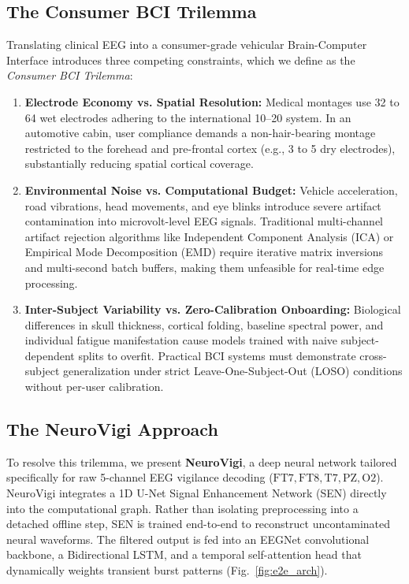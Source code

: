 \documentclass[conference]{IEEEtran}
\begin{document}
\subsection{The Consumer BCI Trilemma}
Translating clinical EEG into a consumer-grade vehicular Brain-Computer Interface introduces three competing constraints, which we define as the \emph{Consumer BCI Trilemma}:
\begin{enumerate}[leftmargin=*]
    \item \textbf{Electrode Economy vs. Spatial Resolution:} Medical montages use 32 to 64 wet electrodes adhering to the international 10--20 system. In an automotive cabin, user compliance demands a non-hair-bearing montage restricted to the forehead and pre-frontal cortex (e.g., 3 to 5 dry electrodes), substantially reducing spatial cortical coverage.
    \item \textbf{Environmental Noise vs. Computational Budget:} Vehicle acceleration, road vibrations, head movements, and eye blinks introduce severe artifact contamination into microvolt-level EEG signals. Traditional multi-channel artifact rejection algorithms like Independent Component Analysis (ICA) or Empirical Mode Decomposition (EMD) require iterative matrix inversions and multi-second batch buffers, making them unfeasible for real-time edge processing.
    \item \textbf{Inter-Subject Variability vs. Zero-Calibration Onboarding:} Biological differences in skull thickness, cortical folding, baseline spectral power, and individual fatigue manifestation cause models trained with naive subject-dependent splits to overfit. Practical BCI systems must demonstrate cross-subject generalization under strict Leave-One-Subject-Out (LOSO) conditions without per-user calibration.
\end{enumerate}

\subsection{The NeuroVigi Approach}
To resolve this trilemma, we present \textbf{NeuroVigi}, a deep neural network tailored specifically for raw 5-channel EEG vigilance decoding ($\text{FT7}, \text{FT8}, \text{T7}, \text{PZ}, \text{O2}$). NeuroVigi integrates a 1D U-Net Signal Enhancement Network (SEN) directly into the computational graph. Rather than isolating preprocessing into a detached offline step, SEN is trained end-to-end to reconstruct uncontaminated neural waveforms. The filtered output is fed into an EEGNet convolutional backbone, a Bidirectional LSTM, and a temporal self-attention head that dynamically weights transient burst patterns (Fig.~\ref{fig:e2e_arch}).
\end{document}
